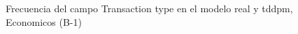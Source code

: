 \begin{figure}[H]
    \centering
    
    \caption{Frecuencia del campo Transaction type en el modelo real y tddpm, Economicos (B-1)}
    \label{frecuency-Transaction Type-tddpm_mlp}
\end{figure}